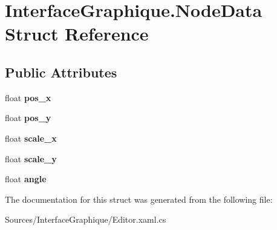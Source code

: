 \hypertarget{struct_interface_graphique_1_1_node_data}{}\section{Interface\+Graphique.\+Node\+Data Struct Reference}
\label{struct_interface_graphique_1_1_node_data}
\subsection*{Public Attributes}
\begin{DoxyCompactItemize}
\item 
\hypertarget{struct_interface_graphique_1_1_node_data_aa65b000f8aca6ca4ef06867dece673bc}{}float {\bfseries pos\+\_\+x}\label{struct_interface_graphique_1_1_node_data_aa65b000f8aca6ca4ef06867dece673bc}

\item 
\hypertarget{struct_interface_graphique_1_1_node_data_a9f8a6932e2af21e5c9de9ca0da1b10d5}{}float {\bfseries pos\+\_\+y}\label{struct_interface_graphique_1_1_node_data_a9f8a6932e2af21e5c9de9ca0da1b10d5}

\item 
\hypertarget{struct_interface_graphique_1_1_node_data_af70290d20df57f31d3836eb0d43849f8}{}float {\bfseries scale\+\_\+x}\label{struct_interface_graphique_1_1_node_data_af70290d20df57f31d3836eb0d43849f8}

\item 
\hypertarget{struct_interface_graphique_1_1_node_data_a40c67aeb78481a26523814f70e839ddd}{}float {\bfseries scale\+\_\+y}\label{struct_interface_graphique_1_1_node_data_a40c67aeb78481a26523814f70e839ddd}

\item 
\hypertarget{struct_interface_graphique_1_1_node_data_a667c8cab7e202742610cb8ce22ad1e45}{}float {\bfseries angle}\label{struct_interface_graphique_1_1_node_data_a667c8cab7e202742610cb8ce22ad1e45}

\end{DoxyCompactItemize}


The documentation for this struct was generated from the following file\+:\begin{DoxyCompactItemize}
\item 
Sources/\+Interface\+Graphique/Editor.\+xaml.\+cs\end{DoxyCompactItemize}
